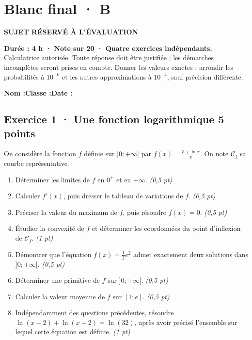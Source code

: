 \fi

\fi

\ifprof

\clearpage{}\label{sujet:9-4}

\section*{Blanc final · B}

{\sffamily\bfseries\color{amber}SUJET RÉSERVÉ À L'ÉVALUATION\par}

\textbf{Durée : 4 h · Note sur 20 · Quatre exercices indépendants.}\\Calculatrice autorisée. Toute réponse doit être justifiée ; les démarches incomplètes seront prises en compte. Donner les valeurs exactes ; arrondir les probabilités à $10^{-6}$ et les autres approximations à $10^{-4}$, sauf précision différente.

\smallskip\textbf{Nom :}\enspace\dotfill\quad\textbf{Classe :}\enspace\dotfill\quad\textbf{Date :}\enspace\dotfill

\subsection*{Exercice 1 · Une fonction logarithmique \hfill 5 points}On considère la fonction $f$ définie sur $]0;+\infty[$ par $f(x)=\frac{3+\ln x}x$. On note $\mathcal C_f$ sa courbe représentative.

\begin{enumerate}

\item Déterminer les limites de $f$ en $0^+$ et en $+\infty$. \hfill\textit{(0,5 pt)}

\item Calculer $f' (x)$, puis dresser le tableau de variations de $f$. \hfill\textit{(0,5 pt)}

\item Préciser la valeur du maximum de $f$, puis résoudre $f(x)=0$. \hfill\textit{(0,5 pt)}

\item Étudier la convexité de $f$ et déterminer les coordonnées du point d'inflexion de $\mathcal C_f$. \hfill\textit{(1 pt)}

\item Démontrer que l'équation $f(x)=\frac12 e^{2}$ admet exactement deux solutions dans $]0;+\infty[$. \hfill\textit{(0,5 pt)}

\item Déterminer une primitive de $f$ sur $]0;+\infty[$. \hfill\textit{(0,5 pt)}

\item Calculer la valeur moyenne de $f$ sur $[1;e]$. \hfill\textit{(0,5 pt)}

\item Indépendamment des questions précédentes, résoudre $\ln(x-2)+\ln(x+2)=\ln(32)$, après avoir précisé l'ensemble sur lequel cette équation est définie. \hfill\textit{(1 pt)}

\end{enumerate}

